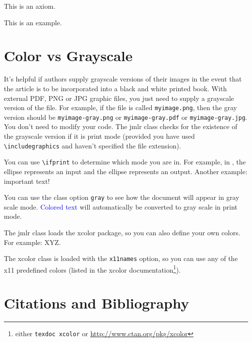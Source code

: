 \documentclass[pmlr,twocolumn]{jmlr} %
\begin{document}
\begin{axiom}\label{ax:sample}
This is an axiom.
\end{axiom}

\begin{example}[An Example]\label{ex:sample}
This is an example.
\end{example}

\section{Color vs Grayscale}
\label{sec:color}

It's helpful if authors supply grayscale versions of their
images in the event that the article is to be incorporated into
a black and white printed book. With external PDF, PNG or JPG
graphic files, you just need to supply a grayscale version of the
file. For example, if the file is called \texttt{myimage.png},
then the gray version should be \texttt{myimage-gray.png} or
\texttt{myimage-gray.pdf} or \texttt{myimage-gray.jpg}. You don't
need to modify your code. The \textsf{jmlr} class checks for
the existence of the grayscale version if it is print mode 
(provided you have used \verb|\includegraphics| and haven't
specified the file extension).

You can use \verb|\ifprint| to determine which mode you are in.
For example, in , the 
 ellipse represents an input and the
 ellipse represents an output.
Another example: {\ifprint{\bfseries}{\color{red}}important text!}

You can use the class option \texttt{gray} to see how the
document will appear in gray scale mode. \textcolor{blue}{Colored
text} will automatically be converted to gray scale in print mode.

The \textsf{jmlr} class loads the \textsf{xcolor}
package, so you can also define your own colors. For example:
\ifprint
  {}%
  {}%
\textcolor{myred}{XYZ}.

The \textsf{xcolor} class is loaded with the \texttt{x11names}
option, so you can use any of the x11 predefined colors (listed
in the \textsf{xcolor} documentation\footnote{either 
\texttt{texdoc xcolor} or \url{http://www.ctan.org/pkg/xcolor}}).

\section{Citations and Bibliography}
\label{sec:cite}
\end{document}
